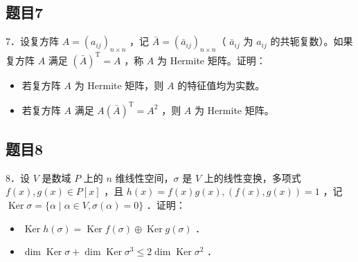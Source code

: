 \documentclass{article}
\begin{document}
\subsection{题目7}
7．设复方阵 \(A=\left(a_{i j}\right)_{n \times n}\) ，记 \(\bar{A}=\left(\bar{a}_{i j}\right)_{n \times n}\)（ \(\bar{a}_{i j}\) 为 \(a_{i j}\) 的共轭复数）。如果复方阵 \(A\) 满足 \((\bar{A})^{\mathrm{T}}=A\) ，称 \(A\) 为 Hermite 矩阵。证明：

\begin{itemize}
  \item[（1）] 若复方阵 \(A\) 为 Hermite 矩阵，则 \(A\) 的特征值均为实数。
  \item[（2）] 若复方阵 \(A\) 满足 \(A(\bar{A})^{\mathrm{T}}=A^{2}\) ，则 \(A\) 为 Hermite 矩阵。
\end{itemize}

\subsection{题目8}
8．设 \(V\) 是数域 \(P\) 上的 \(n\) 维线性空间，\(\sigma\) 是 \(V\) 上的线性变换，多项式 \(f(x), g(x) \in P[x]\) ，且 \(h(x)=f(x) g(x),(f(x), g(x))=1\) ，记 \(\operatorname{Ker} \sigma=\{\alpha \mid \alpha \in V, \sigma(\alpha)=0\}\) ．证明：

\begin{itemize}
  \item[（1）] \(\operatorname{Ker} h(\sigma)=\operatorname{Ker} f(\sigma) \oplus \operatorname{Ker} g(\sigma)\) ．
  \item[（2）] \(\operatorname{dim} \operatorname{Ker} \sigma+\operatorname{dim} \operatorname{Ker} \sigma^{3} \leq 2 \operatorname{dim} \operatorname{Ker} \sigma^{2}\) ．
\end{itemize}
\end{document}
